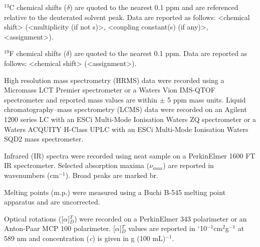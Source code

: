 $^{13}$C chemical shifts ($\delta$) are quoted to the nearest 0.1 ppm and are referenced relative to the deuterated solvent peak\cite{Gottlieb1997}. Data are reported as follows: <chemical shift> (<multiplicity (if not s)>, <coupling constant(s) (if any)>, <assignment>).

$^{19}$F chemical shifts ($\delta$) are quoted to the nearest 0.1 ppm. Data are reported as follows: <chemical shift> (<assignment>).

High resolution mass spectrometry (HRMS) data were recorded using a Micromass LCT Premier spectrometer or a Waters Vion IMS-QTOF spectrometer and reported mass values are within $\pm$ 5 ppm mass units. Liquid chromatography–mass spectrometry (LCMS) data were recorded on an Agilent 1200 series LC with an ESCi Multi-Mode Ionisation Waters ZQ spectrometer or a Waters ACQUITY H-Class UPLC with an ESCi Multi-Mode Ionisation Waters SQD2 mass spectrometer.

Infrared (IR) spectra were recorded using neat sample on a PerkinElmer 1600 FT IR spectrometer. Selected absorption maxima ($\nu_{max}$) are reported in wavenumbers (cm$^{-1}$). Broad peaks are marked br.

Melting points (m.p.) were measured using a Buchi B-545 melting point apparatus and are uncorrected. 

Optical rotations ([$\alpha$]$_D^T$) were recorded on a PerkinElmer 343 polarimeter or an Anton-Paar MCP 100 polarimeter. [$\alpha$]$_D^T$ values are reported in $^{\circ}$10$^{-1}$cm$^2$g$^{-1}$ at 589 nm and concentration (\textit{c}) is given in g (100 mL)$^{-1}$. 




%
%

